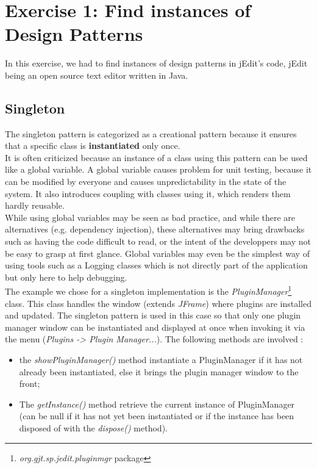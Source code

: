 \section{Exercise 1: Find instances of Design Patterns}

In this exercise, we had to find instances of design patterns in jEdit's
code, jEdit being an open source text editor written in Java.

\subsection{Singleton}

The singleton pattern is categorized as a creational pattern because it
ensures that a specific class is \textbf{instantiated} only once.\\

It is often criticized because an instance of a class using this pattern
can be used like a global variable. A global variable causes problem for
unit testing, because it can be modified by everyone and causes
unpredictability in the state of the system. It also introduces coupling
with classes using it, which renders them hardly reusable.\\

While using global variables may be seen as bad practice, and while
there are alternatives (e.g. dependency injection), these alternatives
may bring drawbacks such as having the code difficult to read, or the
intent of the developpers may not be easy to grasp at first glance.
Global variables may even be the simplest way of using tools such as a
Logging classes which is not directly part of the application but only
here to help debugging.\\

The example we chose for a singleton implementation is the
\emph{PluginManager}\footnote{\emph{org.gjt.sp.jedit.pluginmgr} package}
class. This class handles the window (extends \emph{JFrame}) where
plugins are installed and updated. The singleton pattern is used in this
case so that only one plugin manager window can be instantiated and
displayed at once when invoking it via the menu (\emph{Plugins -> Plugin
Manager...}). The following methods are involved :

\begin{itemize}\itemsep1pt
    \item the \emph{showPluginManager()} method instantiate a PluginManager if
    it has not already been instantiated, else it brings the plugin manager
    window to the front;

    \item The \emph{getInstance()} method retrieve the current instance of
    PluginManager (can be null if it has not yet been instantiated or if
    the instance has been disposed of with the \emph{dispose()} method).
\end{itemize}

